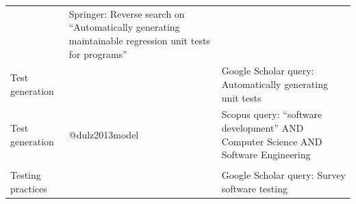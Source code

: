 \documentclass[]{book}
\begin{document}
\begin{longtable}[]{@{}lll@{}}
\begin{minipage}[t]{0.41\columnwidth}
\citet{bowring2014obsidian}\strut
\end{minipage} & \begin{minipage}[t]{0.32\columnwidth}\raggedright\strut
Springer: Reverse search on ``Automatically generating maintainable
regression unit tests for programs''\strut
\end{minipage}\tabularnewline
\begin{minipage}[t]{0.19\columnwidth}\raggedright\strut
Test generation\strut
\end{minipage} & \begin{minipage}[t]{0.41\columnwidth}\raggedright\strut
\citet{shamshiri2018automatically}\strut
\end{minipage} & \begin{minipage}[t]{0.32\columnwidth}\raggedright\strut
Google Scholar query: Automatically generating unit tests\strut
\end{minipage}\tabularnewline
\begin{minipage}[t]{0.19\columnwidth}\raggedright\strut
Test generation\strut
\end{minipage} & \begin{minipage}[t]{0.41\columnwidth}\raggedright\strut
@dulz2013model\strut
\end{minipage} & \begin{minipage}[t]{0.32\columnwidth}\raggedright\strut
Scopus query: ``software development'' AND Computer Science AND Software
Engineering\strut
\end{minipage}\tabularnewline
\begin{minipage}[t]{0.19\columnwidth}\raggedright\strut
\strut
\end{minipage} & \begin{minipage}[t]{0.41\columnwidth}\raggedright\strut
\strut
\end{minipage} & \begin{minipage}[t]{0.32\columnwidth}\raggedright\strut
\strut
\end{minipage}\tabularnewline
\begin{minipage}[t]{0.19\columnwidth}\raggedright\strut
Testing practices\strut
\end{minipage} & \begin{minipage}[t]{0.41\columnwidth}\raggedright\strut
\citet{GAROUSI20131354}\strut
\end{minipage} & \begin{minipage}[t]{0.32\columnwidth}\raggedright\strut
Google Scholar query: Survey software testing\strut
\end{minipage}\tabularnewline

\end{longtable}
\end{document}
